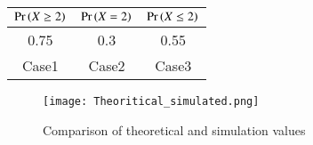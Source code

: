 \documentclass[journal,12pt,twocolumn]{IEEEtran}
\begin{document}
    \begin{center}
  
  \begin{tabular}{|c|c|c|}
    \hline
    $\Pr\left(X \geq 2\right)$ &  $\Pr \left(X = 2\right)$ & $\Pr\left(X \leq 2\right)$\\
    \hline
     0.75& 0.3& 0.55 \\
    \hline
    Case1 &Case2 &Case3\\
    \hline
\end{tabular}
\end{center}
\begin{figure}[ht]
    \centering
    \texttt{[image: Theoritical\_simulated.png]}
    \caption{Comparison of theoretical and simulation values}
    \label{Figure_1}
\end{figure}
\end{document}
